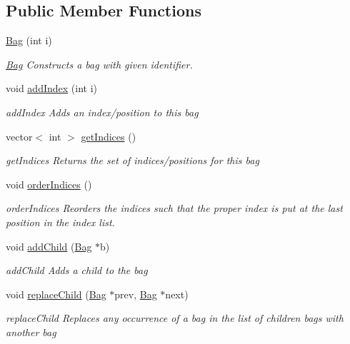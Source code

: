\subsection*{Public Member Functions}
\begin{DoxyCompactItemize}
\item 
\hyperlink{class_bag_aaa75e2de63f2f6199973471491cb9e13}{Bag} (int i)
\begin{DoxyCompactList}\small\item\em \hyperlink{class_bag}{Bag} Constructs a bag with given identifier. \end{DoxyCompactList}\item 
void \hyperlink{class_bag_a4f5fcc1b48aeb967653a0d5364254562}{add\+Index} (int i)
\begin{DoxyCompactList}\small\item\em add\+Index Adds an index/position to this bag \end{DoxyCompactList}\item 
vector$<$ int $>$ \hyperlink{class_bag_ad05a3a0069514372df097ec7d0cbe638}{get\+Indices} ()
\begin{DoxyCompactList}\small\item\em get\+Indices Returns the set of indices/positions for this bag \end{DoxyCompactList}\item 
void \hyperlink{class_bag_a8dfb102ead7412437b5f69b582784e44}{order\+Indices} ()
\begin{DoxyCompactList}\small\item\em order\+Indices Reorders the indices such that the proper index is put at the last position in the index list. \end{DoxyCompactList}\item 
void \hyperlink{class_bag_a36747193c7212f45b68552c3ea31fd70}{add\+Child} (\hyperlink{class_bag}{Bag} $\ast$b)
\begin{DoxyCompactList}\small\item\em add\+Child Adds a child to the bag \end{DoxyCompactList}\item 
void \hyperlink{class_bag_ade9c24ae6e76c2e0c27bc5b51929f64a}{replace\+Child} (\hyperlink{class_bag}{Bag} $\ast$prev, \hyperlink{class_bag}{Bag} $\ast$next)
\begin{DoxyCompactList}\small\item\em replace\+Child Replaces any occurrence of a bag in the list of children bags with another bag \end{DoxyCompactList}\item 

\end{DoxyCompactItemize}
